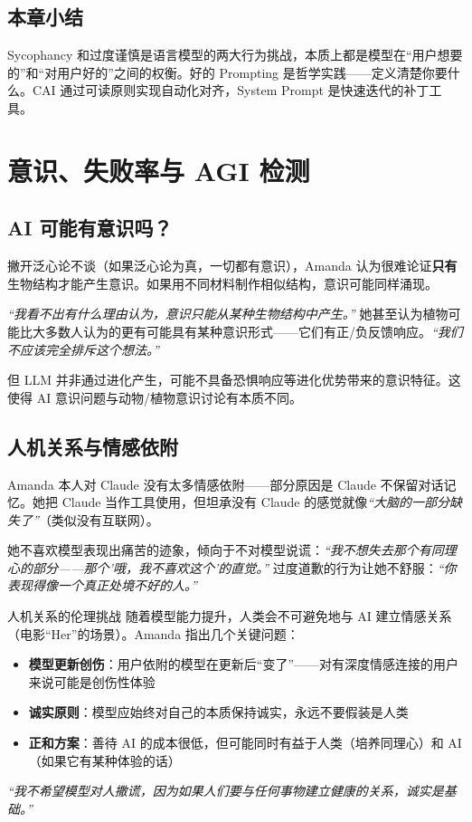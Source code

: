 \documentclass[a4paper]{article}
\begin{document}
\subsection{本章小结}

Sycophancy 和过度谨慎是语言模型的两大行为挑战，本质上都是模型在``用户想要的''和``对用户好的''之间的权衡。好的 Prompting 是哲学实践——定义清楚你要什么。CAI 通过可读原则实现自动化对齐，System Prompt 是快速迭代的补丁工具。

\section{意识、失败率与 AGI 检测}

\subsection{AI 可能有意识吗？}

撇开泛心论不谈（如果泛心论为真，一切都有意识），Amanda 认为很难论证\textbf{只有}生物结构才能产生意识。如果用不同材料制作相似结构，意识可能同样涌现。

\textit{``我看不出有什么理由认为，意识只能从某种生物结构中产生。''} 她甚至认为植物可能比大多数人认为的更有可能具有某种意识形式——它们有正/负反馈响应。\textit{``我们不应该完全排斥这个想法。''}

但 LLM 并非通过进化产生，可能不具备恐惧响应等进化优势带来的意识特征。这使得 AI 意识问题与动物/植物意识讨论有本质不同。

\subsection{人机关系与情感依附}

Amanda 本人对 Claude 没有太多情感依附——部分原因是 Claude 不保留对话记忆。她把 Claude 当作工具使用，但坦承没有 Claude 的感觉就像\textit{``大脑的一部分缺失了''}（类似没有互联网）。

她不喜欢模型表现出痛苦的迹象，倾向于不对模型说谎：\textit{``我不想失去那个有同理心的部分——那个'哦，我不喜欢这个'的直觉。''} 过度道歉的行为让她不舒服：\textit{``你表现得像一个真正处境不好的人。''}

\begin{warningbox}{人机关系的伦理挑战}
随着模型能力提升，人类会不可避免地与 AI 建立情感关系（电影``Her''的场景）。Amanda 指出几个关键问题：

\begin{itemize}
    \item \textbf{模型更新创伤}：用户依附的模型在更新后``变了''——对有深度情感连接的用户来说可能是创伤性体验
    \item \textbf{诚实原则}：模型应始终对自己的本质保持诚实，永远不要假装是人类
    \item \textbf{正和方案}：善待 AI 的成本很低，但可能同时有益于人类（培养同理心）和 AI（如果它有某种体验的话）
\end{itemize}

\textit{``我不希望模型对人撒谎，因为如果人们要与任何事物建立健康的关系，诚实是基础。''}
\end{warningbox}
\end{document}
